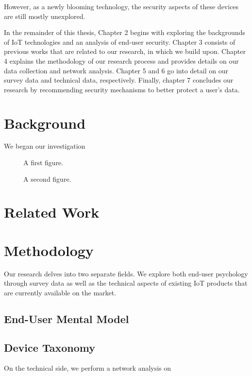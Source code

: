 \documentclass[12pt, draft]{ucthesis}
\begin{document}
However, as a newly blooming technology, the security aspects of these devices are still mostly unexplored. 

In the remainder of this thesis, Chapter 2 begins with exploring the backgrounds of IoT technologies and an analysis of end-user security. Chapter 3 consists of previous works that are related to our research, in which we build upon. Chapter 4 explains the methodology of our research process and provides details on our data collection and network analysis. Chapter 5 and 6 go into detail on our survey data and technical data, respectively. Finally, chapter 7 concludes our research by recommending security mechanisms to better protect a user's data.

\chapter{Background}
We began our investigation 

\begin{figure}
\caption{A first figure.}
\end{figure}

\begin{figure}
\caption{A second figure.}
\end{figure}

\chapter{Related Work}


\chapter{Methodology}
Our research delves into two separate fields. We explore both end-user psychology through survey data as well as the technical aspects of existing IoT products that are currently available on the market.

\section{End-User Mental Model}


\section{Device Taxonomy}
On the technical side, we perform a network analysis on 
\end{document}
